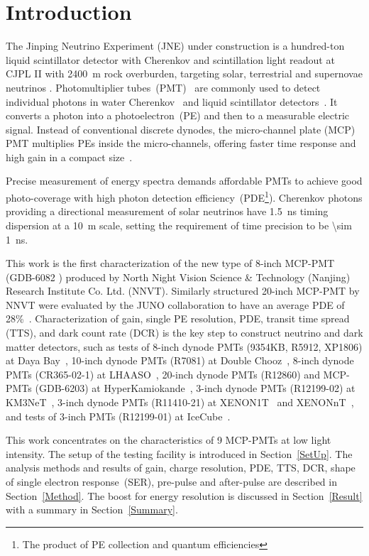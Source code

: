\section{Introduction}
The Jinping Neutrino Experiment (JNE) under construction is a hundred-ton liquid scintillator detector with Cherenkov and scintillation light readout
 at CJPL II with \SI{2400}{m} rock overburden, targeting solar, terrestrial and supernovae neutrinos \cite{LetterJNE2017,xu_jinping_2020,xu_innovations_2022,xu_design_2022}.
Photomultiplier tubes~(PMT)~\cite{HAMAMATSUManual} are commonly used to detect individual photons in water Cherenkov~\cite{SNO,SuperK} and liquid scintillator detectors~\cite{KamLAND,JUNO:2015zny}. It converts a photon into a photoelectron~(PE) and then to a measurable electric signal.  Instead of conventional discrete dynodes, the micro-channel plate (MCP) PMT multiplies PEs inside the micro-channels, offering faster time response and high gain in a compact size~\cite{HAMAMATSUManual}.

Precise measurement of energy spectra demands affordable PMTs to achieve good photo-coverage with high photon detection efficiency~(PDE\footnote{The product of PE collection and quantum efficiencies}). Cherenkov photons providing a directional measurement of solar neutrinos have \SI{1.5}{ns} timing dispersion at a \SI{10}{m} scale, setting the requirement of time precision to be \SI{\sim 1}{ns}.


This work is the first characterization of
 the new type of 8-inch MCP-PMT (GDB-6082 \cite{GDB-6082}) produced by North Night Vision Science \& Technology (Nanjing) Research Institute Co. Ltd. (NNVT). %
Similarly structured 20-inch MCP-PMT by NNVT were evaluated by the JUNO collaboration to have an average PDE of 28\%~\cite{JUNOMassTesting}.
Characterization of gain, single PE resolution, PDE, transit time spread (TTS), and dark count rate (DCR) is the key step to construct neutrino and dark matter detectors, such as tests of
 8-inch dynode PMTs (9354KB, R5912, XP1806) at Daya Bay~\cite{DayaBayTesting}, 10-inch dynode PMTs (R7081) at Double Chooz~\cite{DoubleChoozeTesting}, 8-inch dynode PMTs (CR365-02-1) at LHAASO~\cite{LHAASOTesting}, 20-inch dynode PMTs (R12860) and MCP-PMTs (GDB-6203) at HyperKamiokande~\cite{HyperKTesting}, 3-inch dynode PMTs (R12199-02) at KM3NeT~\cite{KM3NetTesting}, 3-inch dynode PMTs (R11410-21) at XENON1T~\cite{XENON1TTesting} and XENONnT~\cite{XENONnTTesting}, and tests of 3-inch PMTs (R12199-01) at IceCube~\cite{IceCubeTesting}.

This work concentrates on the characteristics of 9 MCP-PMTs at low light intensity. The setup of the testing facility is introduced in Section~\ref{SetUp}. The analysis methods and results of gain, charge resolution, PDE, TTS, DCR, shape of single electron response~(SER), pre-pulse and after-pulse are described in Section~\ref{Method}. The boost for energy resolution is discussed in Section~\ref{Result} with a summary in Section~\ref{Summary}.

